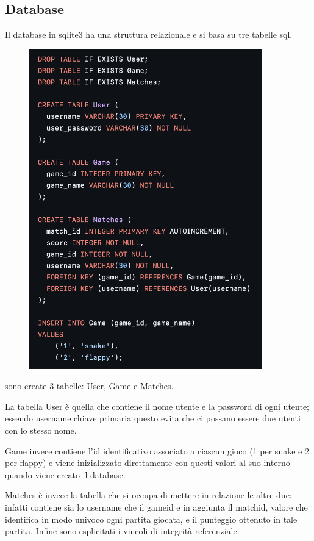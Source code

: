 \documentclass{article}
\begin{document}
\subsection{Database}
Il database in sqlite3 ha una struttura relazionale e si basa su tre tabelle sql.
\begin{figure}[H]
    \centering
    \includegraphics[width=0.9\textwidth]{images/schema_sql.png}
\end{figure}

sono create 3 tabelle: User, Game e Matches.

La tabella User è quella che contiene il nome utente e la password di ogni utente; essendo username chiave primaria questo evita che ci possano essere due utenti con lo stesso nome.

Game invece contiene l’id identificativo associato a ciascun gioco (1 per snake e 2 per flappy) e viene inizializzato direttamente con questi valori al suo interno quando viene creato il database.

Matches è invece la tabella che si occupa di mettere in relazione le altre due: infatti contiene sia lo username che il game\textunderscore id e in aggiunta il match\textunderscore id, valore che identifica in modo univoco ogni partita giocata, e il punteggio ottenuto in tale partita. 
Infine sono esplicitati i vincoli di integrità referenziale.
\end{document}
